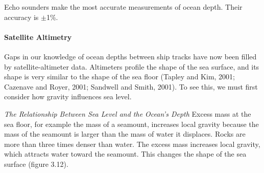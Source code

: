 Echo sounders make the most
accurate measurements of ocean depth. Their
accuracy is $\pm$1\%.

\paragraph{Satellite Altimetry} Gaps in our knowledge of ocean depths between ship tracks have
now been filled by satellite-altimeter data. Altimeters profile the
shape of the sea surface, and its shape is very similar to the shape
of the sea floor (Tapley and Kim, 2001; Cazenave and Royer, 2001;
Sandwell and Smith, 2001). To see this, we must first consider how
gravity influences sea level.

\textit{The Relationship Between Sea Level and the Ocean's Depth}
Excess mass at the sea floor, for example the mass of a seamount,
increases local gravity because the mass of the seamount is larger
than the mass of water it displaces. Rocks are more than three times
denser than water. The excess mass increases local gravity, which
attracts water toward the seamount. This changes the shape of the sea
surface (figure 3.12).

